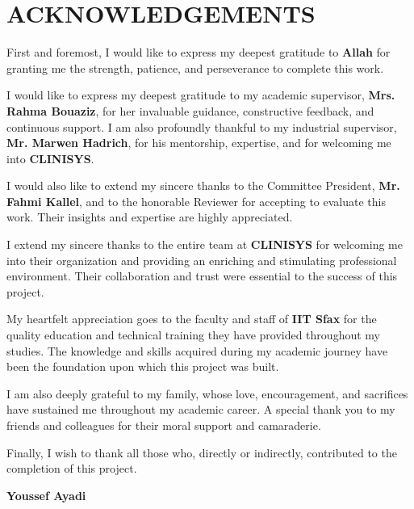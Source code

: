 \chapter*{ACKNOWLEDGEMENTS}
\thispagestyle{MyStyle}

\par
First and foremost, I would like to express my deepest gratitude to \textbf{Allah} for granting me the strength, patience, and perseverance to complete this work.

\par
I would like to express my deepest gratitude to my academic supervisor, \textbf{Mrs. Rahma Bouaziz}, for her invaluable guidance, constructive feedback, and continuous support. I am also profoundly thankful to my industrial supervisor, \textbf{Mr. Marwen Hadrich}, for his mentorship, expertise, and for welcoming me into \textbf{CLINISYS}.

\par
I would also like to extend my sincere thanks to the Committee President, \textbf{Mr. Fahmi Kallel}, and to the honorable Reviewer for accepting to evaluate this work. Their insights and expertise are highly appreciated.

\par
I extend my sincere thanks to the entire team at \textbf{CLINISYS} for welcoming me into their organization and providing an enriching and stimulating professional environment. Their collaboration and trust were essential to the success of this project.

\par
My heartfelt appreciation goes to the faculty and staff of \textbf{IIT Sfax} for the quality education and technical training they have provided throughout my studies. The knowledge and skills acquired during my academic journey have been the foundation upon which this project was built.

\par
I am also deeply grateful to my family, whose love, encouragement, and sacrifices have sustained me throughout my academic career. A special thank you to my friends and colleagues for their moral support and camaraderie.

\par
Finally, I wish to thank all those who, directly or indirectly, contributed to the completion of this project.

\vspace{1cm}
\begin{flushright}
\textbf{Youssef Ayadi}
\end{flushright}